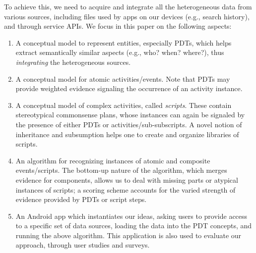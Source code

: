 \documentclass[11pt]{article}
\begin{document}
To achieve this, we need to acquire and integrate all the  heterogeneous data from  various  sources, including files  used by apps on our devices (e.g., search history), and  through service APIs. We focus in this paper on the following aspects: 
\begin{enumerate}[noitemsep]
    \item  A conceptual model to represent entities, especially PDTs, which helps extract  semantically similar aspects (e.g., who? when? where?), thus {\em integrating}   the   heterogeneous sources.
    \item  A conceptual model for atomic activities/events. Note that PDTs may provide weighted evidence signaling the occurrence of an activity instance.
    \item A conceptual model of complex activities, called  {\em scripts}. These contain stereotypical commonsense plans, whose instances can again be signaled by the presence of either PDTs  or activities/sub-subscripts. A novel notion of inheritance and subsumption helps one to create and organize libraries of scripts.
    \item An   algorithm for  recognizing instances of atomic and composite events/scripts.  The bottom-up nature of the algorithm, which merges evidence for components, allows us to deal with missing parts or atypical instances of scripts;  a scoring scheme  accounts for the varied strength of evidence provided by PDTs or script steps.

  \item An Android app which instantiates our ideas, asking users to
provide access to a specific set of data sources, loading the data
into the PDT concepts, and running the above algorithm. 
  This application is also used to evaluate our approach, through user studies and surveys.
\end{enumerate}
 
\end{document}
